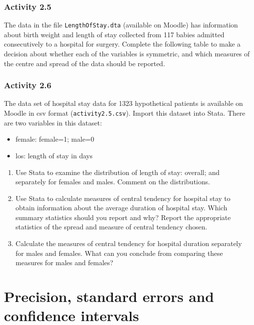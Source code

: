 \documentclass[
]{memoir}
\providecommand{\tightlist}{%
  \setlength{\itemsep}{0pt}\setlength{\parskip}{0pt}}
\begin{document}
\hypertarget{activity-2.5}{%
\subsection*{Activity 2.5}\label{activity-2.5}}

The data in the file \texttt{LengthOfStay.dta} (available on Moodle) has information about birth weight and length of stay collected from 117 babies admitted consecutively to a hospital for surgery. Complete the following table to make a decision about whether each of the variables is symmetric, and which measures of the centre and spread of the data should be reported.

\hypertarget{activity-2.6}{%
\subsection*{Activity 2.6}\label{activity-2.6}}

The data set of hospital stay data for 1323 hypothetical patients is available on Moodle in csv format (\texttt{activity2.5.csv}). Import this dataset into Stata. There are two variables in this dataset:

\begin{itemize}
\tightlist
\item
  female: female=1; male=0
\item
  los: length of stay in days
\end{itemize}

\begin{enumerate}
\def\labelenumi{\alph{enumi})}
\tightlist
\item
  Use Stata to examine the distribution of length of stay: overall; and separately for females and males. Comment on the distributions.
\item
  Use Stata to calculate measures of central tendency for hospital stay to obtain information about the average duration of hospital stay. Which summary statistics should you report and why? Report the appropriate statistics of the spread and measure of central tendency chosen.
\item
  Calculate the measures of central tendency for hospital duration separately for males and females. What can you conclude from comparing these measures for males and females?
\end{enumerate}

\hypertarget{precision-standard-errors-and-confidence-intervals}{%
\chapter{Precision, standard errors and confidence intervals}\label{precision-standard-errors-and-confidence-intervals}}
\end{document}
